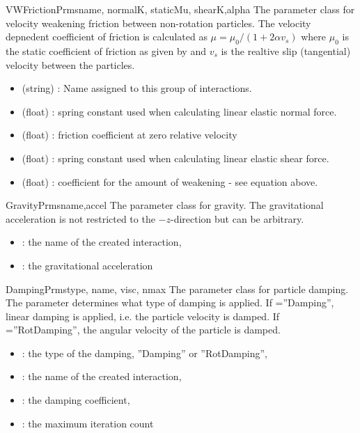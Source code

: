 \documentclass{manual}
\begin{document}
\begin{classdesc}{VWFrictionPrms}{name, normalK, staticMu, shearK,alpha}
The parameter class for velocity weakening friction between non-rotation particles. The velocity depnedent coefficient of friction is calculated as $\mu=\mu_0/(1+2\alpha v_s)$ where $\mu_0$ is the static coefficient of friction as given by  and $v_s$ is the realtive slip (tangential) velocity between the particles.
\begin{itemize}
\item {} (string) :  Name assigned to this group of interactions.
\item {} (float) : spring constant used when calculating linear elastic normal force.
\item {} (float) : friction coefficient at zero relative velocity
\item {} (float) : spring constant used when calculating linear elastic shear force.
\item {} (float) : coefficient for the amount of weakening - see equation above.
\end{itemize}
 

\end{classdesc}

\begin{classdesc}{GravityPrms}{name,accel}
The parameter class for gravity. The gravitational acceleration  is not restricted to the $-z$-direction but can be arbitrary. 
\begin{itemize}
\item {} : the name of the created interaction,
\item {} : the gravitational acceleration
\end{itemize}
\end{classdesc}

\begin{classdesc}{DampingPrms}{type, name, visc, nmax}
The parameter class for particle damping. The parameter  determines what type of damping is applied. If =''Damping'', linear damping is applied, i.e. the particle velocity is damped. If =''RotDamping'', the angular velocity of the particle is damped. 
\begin{itemize}
\item {} : the type of the damping, ''Damping'' or ''RotDamping'',
\item {} : the name of the created interaction,
\item {} : the damping coefficient,
\item {} : the maximum iteration count
\end{itemize}
\end{classdesc}
\end{document}
